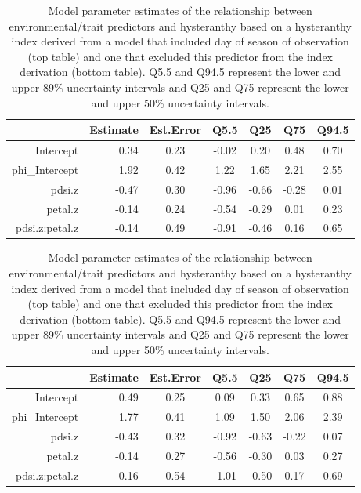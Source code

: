 \documentclass{article}[11pt]
\begin{document}
\begin{table}[ht]
\centering
\begin{tabular}{|rrccccc|}
  \hline
 & Estimate & Est.Error & Q5.5 & Q25 & Q75 & Q94.5 \\ 
  \hline
Intercept & 0.34 & 0.23 & -0.02 & 0.20 & 0.48 & 0.70 \\ 
  phi\_Intercept & 1.92 & 0.42 & 1.22 & 1.65 & 2.21 & 2.55 \\ 
  pdsi.z & -0.47 & 0.30 & -0.96 & -0.66 & -0.28 & 0.01 \\ 
  petal.z & -0.14 & 0.24 & -0.54 & -0.29 & 0.01 & 0.23 \\ 
  pdsi.z:petal.z & -0.14 & 0.49 & -0.91 & -0.46 & 0.16 & 0.65 \\ 
   \hline
\end{tabular}
\begin{tabular}{|rrccccc|}
  \hline
 & Estimate & Est.Error & Q5.5 & Q25 & Q75 & Q94.5 \\ 
  \hline
Intercept & 0.49 & 0.25 & 0.09 & 0.33 & 0.65 & 0.88 \\ 
  phi\_Intercept & 1.77 & 0.41 & 1.09 & 1.50 & 2.06 & 2.39 \\ 
  pdsi.z & -0.43 & 0.32 & -0.92 & -0.63 & -0.22 & 0.07 \\ 
  petal.z & -0.14 & 0.27 & -0.56 & -0.30 & 0.03 & 0.27 \\ 
  pdsi.z:petal.z & -0.16 & 0.54 & -1.01 & -0.50 & 0.17 & 0.69 \\ 
   \hline
\end{tabular}
\caption{Model parameter estimates of the relationship between environmental/trait predictors and hysteranthy based on a hysteranthy index derived from a model that included day of season of observation (top table) and one that excluded this predictor from the index derivation (bottom table). Q5.5 and Q94.5 represent the lower and upper 89\% uncertainty intervals and Q25 and Q75 represent the lower and upper 50\% uncertainty intervals.}
\label{tab:nodoy}
\end{table}
\end{document}
